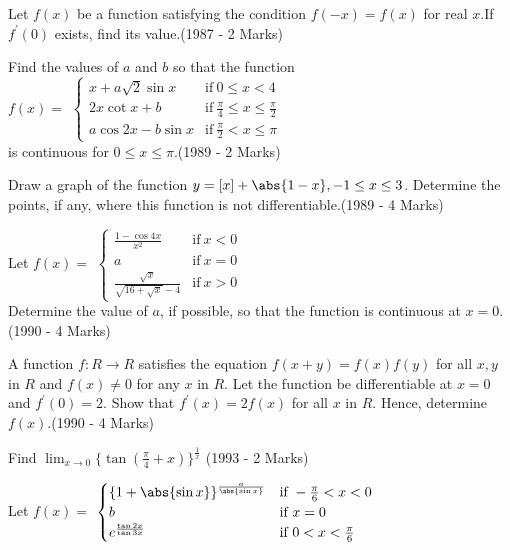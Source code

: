 \iffalse
\title{Chapter-11- Limits,Continuity and  Differentiability}
\author{EE24BTECH11051 - Prajwal}
\section{subjective}
\fi 

	\item Let $f(x)$ be a function satisfying the condition $f(-x)=f(x)$ for real $x$.If $f^\prime(0)$ exists, find its  value.\hfill (1987 - 2 Marks)
\item Find the values of $a$ and $b$ so that the function\\
$f(x) = $
$\begin{cases}
    x + a{\sqrt2}\sin{x} & \text{if}\  0 \leq x < 4  \\
    2x \cot{x} + b & \text{if} \  \frac{\pi}{4}\leq x \leq  \frac{\pi}{2}\\
    a \cos{2x} - b \sin{x} & \text{if}\ \frac{\pi}{2} < x \leq \pi
\end{cases}$\\ 
is continuous for $0\leq x \leq \pi $.\hfill (1989 - 2 Marks)
\item Draw a graph of the function $y = [x]+\abs{1-x}, -1 \leq x \leq 3$. Determine the points, if any, where this function is not differentiable.\hfill (1989 - 4 Marks)
\item Let $f(x) =$
$\begin{cases}
        \frac{1-\cos{4x}}{x^2} & \text{if}\ x < 0\\
    a & \text{if}\ x = 0 \\
    \frac{\sqrt{x}}{\sqrt{16+\sqrt{x}}- 4} & \text{if}\ x > 0 
\end{cases}$\\
Determine the value of $a$, if possible, so that the function is continuous at $x=0$. \hfill (1990 - 4 Marks)
\item A function $f : R \rightarrow R$ satisfies the equation $f(x+y) = f(x)f(y)$ for all $x,y$ in $R$ and $f(x) \neq 0 $ for any $x$ in $R$. Let the function be differentiable at $x = 0$ and $f^\prime(0)=2.$ Show that $f^\prime(x) = 2f(x)$ for all $x$ in $R$. Hence, determine $f(x)$.\hfil (1990 - 4 Marks)
\item Find $\lim_{x \to 0} \{\tan(\frac{\pi}{4} + x)\}^{\frac{1}{x}}$
\hfill (1993 - 2 Marks)
\item Let $f(x) =$
$\begin{cases}
	\{1 + \abs{\sin{x}}\}^\frac{a}{\abs{\sin{x}}} & \text{if}\ - \frac{\pi}{6} < x < 0 \\
    b & \text{if}\ x = 0\\
    e^\frac{\tan{2x}}{\tan{3x}} & \text{if}\ 0 < x < \frac{\pi}{6}\\
    
\end{cases}$\\
